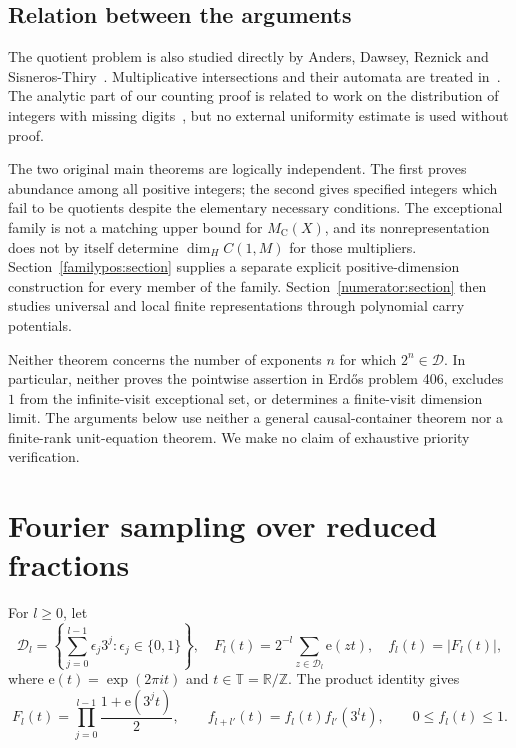 \documentclass[11pt]{article}
\theoremstyle{remark}
\newcommand{\D}{\mathcal D}
\newcommand{\T}{\mathbb T}
\newcommand{\MC}{M_{\mathrm C}}
\newcommand{\ee}[1]{\mathrm e(#1)}
\begin{document}
\subsection{Relation between the arguments}

The quotient problem is also studied directly by Anders, Dawsey,
Reznick and Sisneros-Thiry~\cite{ADRS}. Multiplicative intersections
and their automata are treated in~\cite{AL,ABL}. The analytic part
of our counting proof is related to work on the distribution of
integers with missing digits~\cite{Konyagin,MS}, but no external
uniformity estimate is used without proof.

The two original main theorems are logically independent. The first proves
abundance among all positive integers; the second gives specified
integers which fail to be quotients despite the elementary necessary
conditions. The exceptional family is not a matching upper bound for
$\MC(X)$, and its nonrepresentation does not by itself determine
$\dim_H C(1,M)$ for those multipliers.
Section~\ref{familypos:section} supplies a separate explicit positive-dimension
construction for every member of the family. Section~\ref{numerator:section}
then studies universal and local finite representations through polynomial
carry potentials.

Neither theorem concerns the number of exponents $n$ for which
$2^n\in\D$. In particular, neither proves the pointwise assertion in
Erd\H{o}s problem 406, excludes $1$ from the infinite-visit exceptional
set, or determines a finite-visit dimension limit. The arguments below
use neither a general causal-container theorem nor a finite-rank
unit-equation theorem. We make no claim of exhaustive priority
verification.

\section{Fourier sampling over reduced fractions}

For $l\ge0$, let
\[
 \D_l=\left\{\sum_{j=0}^{l-1}\epsilon_j3^j:
                     \epsilon_j\in\{0,1\}\right\},
 \quad
 F_l(t)=2^{-l}\sum_{z\in\D_l}\ee{zt},\quad f_l(t)=|F_l(t)|,
\]
where $\ee{t}=\exp(2\pi it)$ and $t\in\T=\mathbb R/\mathbb Z$.
The product identity gives
\begin{equation}\label{count:eq:product}
 F_l(t)=\prod_{j=0}^{l-1}\frac{1+\ee{3^jt}}2,
 \qquad
 f_{l+l'}(t)=f_l(t)f_{l'}(3^lt),\qquad 0\le f_l(t)\le1.
\end{equation}
\end{document}
